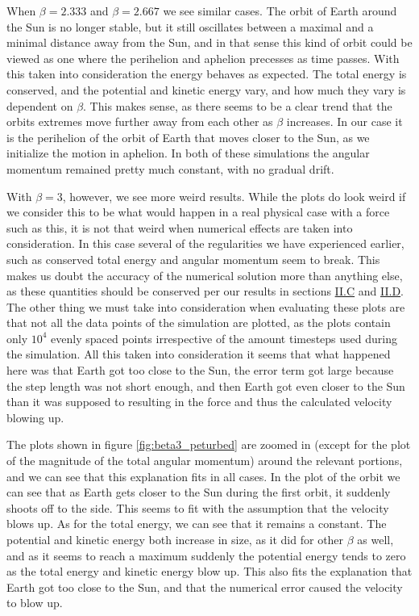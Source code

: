 \documentclass[reprint,english,notitlepage]{revtex4-1}  %
\begin{document}
When $\beta = 2.333$ and $\beta = 2.667$ we see similar cases. The orbit of Earth around the Sun is no longer stable, but it still oscillates between a maximal and a minimal distance away from the Sun, and in that sense this kind of orbit could be viewed as one where the perihelion and aphelion precesses as time passes. With this taken into consideration the energy behaves as expected. The total energy is conserved, and the potential and kinetic energy vary, and how much they vary is dependent on $\beta$. This makes sense, as there seems to be a clear trend that the orbits extremes move further away from each other as $\beta$ increases. In our case it is the perihelion of the orbit of Earth that moves closer to the Sun, as we initialize the motion in aphelion. In both of these simulations the angular momentum remained pretty much constant, with no gradual drift.

With $\beta = 3$, however, we see more weird results. While the plots do look weird if we consider this to be what would happen in a real physical case with a force such as this, it is not that weird when numerical effects are taken into consideration. In this case several of the regularities we have experienced earlier, such as conserved total energy and angular momentum seem to break. This makes us doubt the accuracy of the numerical solution more than anything else, as these quantities should be conserved per our results in sections \hyperref[sec:II:c]{II.C} and \hyperref[sec:II:d]{II.D}. The other thing we must take into consideration when evaluating these plots are that not all the data points of the simulation are plotted, as the plots contain only $10^4$ evenly spaced points irrespective of the amount timesteps used during the simulation. All this taken into consideration it seems that what happened here was that Earth got too close to the Sun, the error term got large because the step length was not short enough, and then Earth got even closer to the Sun than it was supposed to resulting in the force and thus the calculated velocity blowing up.

The plots shown in figure \ref{fig:beta3_peturbed} are zoomed in (except for the plot of the magnitude of the total angular momentum) around the relevant portions, and we can see that this explanation fits in all cases. In the plot of the orbit we can see that as Earth gets closer to the Sun during the first orbit, it suddenly shoots off to the side. This seems to fit with the assumption that the velocity blows up. As for the total energy, we can see that it remains a constant. The potential and kinetic energy both increase in size, as it did for other $\beta$ as well, and as it seems to reach a maximum suddenly the potential energy tends to zero as the total energy and kinetic energy blow up. This also fits the explanation that Earth got too close to the Sun, and that the numerical error caused the velocity to blow up.
\end{document}

